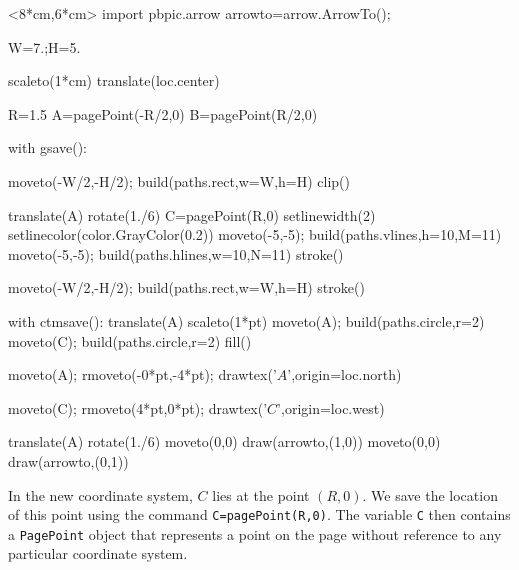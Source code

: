 \documentclass[12pt]{article}
\def\code#1{{\tt #1}}
\begin{document}
\hfil\begin{pbpic}<8*cm,6*cm>
import pbpic.arrow
arrowto=arrow.ArrowTo();

W=7.;H=5.

scaleto(1*cm)
translate(loc.center)

R=1.5
A=pagePoint(-R/2,0)
B=pagePoint(R/2,0)

with gsave():

  moveto(-W/2,-H/2); build(paths.rect,w=W,h=H)
  clip()
  
  translate(A)
  rotate(1./6)
  C=pagePoint(R,0)
  setlinewidth(2)
  setlinecolor(color.GrayColor(0.2))
  moveto(-5,-5); build(paths.vlines,h=10,M=11)
  moveto(-5,-5); build(paths.hlines,w=10,N=11)
  stroke()

moveto(-W/2,-H/2); build(paths.rect,w=W,h=H)
stroke()

with ctmsave():
  translate(A)
  scaleto(1*pt)
  moveto(A); build(paths.circle,r=2)
  moveto(C); build(paths.circle,r=2)  
  fill()

moveto(A); rmoveto(-0*pt,-4*pt);
drawtex('$A$',origin=loc.north)

moveto(C); rmoveto(4*pt,0*pt);
drawtex('$C$',origin=loc.west)


translate(A)
rotate(1./6)
moveto(0,0)
draw(arrowto,(1,0))
moveto(0,0)
draw(arrowto,(0,1))

\end{pbpic}

In the new coordinate system, $C$ lies at the point $(R,0)$.  We
save the location of this point using the command \code{C=pagePoint(R,0)}.
The variable \code{C} then 
contains a \code{PagePoint} object that represents a point 
on the page without reference to any particular coordinate system.
\end{document}
